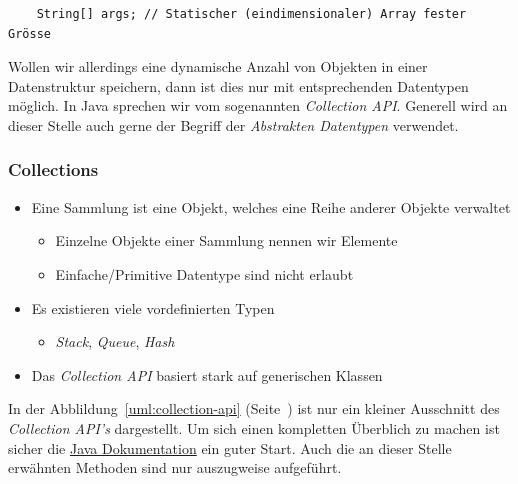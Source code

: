 \begin{verbatim}
    String[] args; // Statischer (eindimensionaler) Array fester Grösse
\end{verbatim}

Wollen wir allerdings eine dynamische Anzahl von Objekten in einer Datenstruktur
speichern, dann ist dies nur mit entsprechenden Datentypen möglich. In Java
sprechen wir vom sogenannten \emph{Collection API}. Generell wird an dieser
Stelle auch gerne der Begriff der \emph{Abstrakten Datentypen} verwendet.

\begin{frame}[fragile]
    \frametitle<presentation>{Collections}
    \begin{itemize}
        \item Eine Sammlung ist eine Objekt, welches eine Reihe anderer
        Objekte verwaltet
        \begin{itemize}
            \item Einzelne Objekte einer Sammlung nennen wir Elemente
            \item Einfache/Primitive Datentype sind nicht erlaubt
        \end{itemize}
        \item Es existieren viele vordefinierten Typen
        \begin{itemize}
            \item \emph{Stack}, \emph{Queue}, \emph{Hash}
        \end{itemize}
        \item Das \emph{Collection API} basiert stark auf generischen Klassen
    \end{itemize}
\end{frame}

In der Abblildung~\ref{uml:collection-api} (Seite~\pageref{uml:collection-api}) ist
nur ein kleiner Ausschnitt des \emph{Collection API's} dargestellt. Um sich einen
kompletten Überblich zu machen ist sicher die
\href{https://docs.oracle.com/en/java/javase/11/docs/api/java.base/java/util/Collection.html}
{Java Dokumentation} ein guter Start. Auch die an dieser Stelle erwähnten Methoden sind
nur auszugweise aufgeführt.

